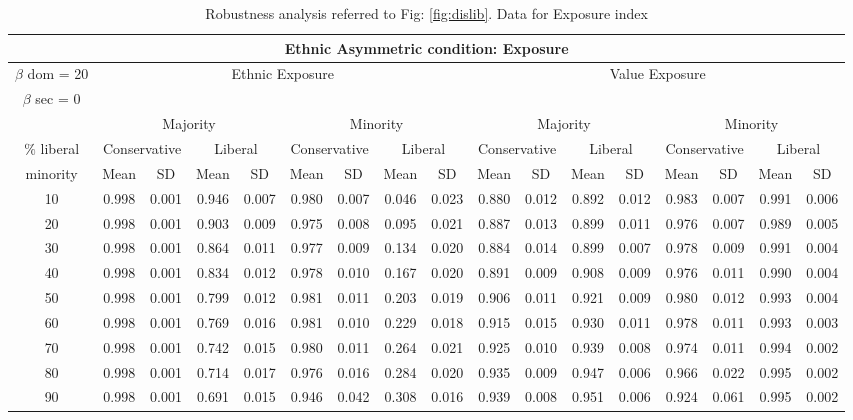 \documentclass{article}
\begin{document}
\begin{table}[H]
{\begin{tabular}{|c|c|c|c|c|c|c|c|c|c|c|c|c|c|c|c|c|}
  \hline
  \multicolumn{17}{|c|}{Ethnic Asymmetric condition: Exposure}  \\\hline
 $\beta$ dom = 20 &  \multicolumn{8}{|c|}{Ethnic Exposure} & \multicolumn{8}{|c|}{Value Exposure}   \\
 
  $\beta$ sec = 0 &  \multicolumn{8}{|c|}{} & \multicolumn{8}{|c|}{}   \\\hline
 
 & \multicolumn{4}{|c|}{Majority} & \multicolumn{4}{|c|}{Minority}  & \multicolumn{4}{|c|}{Majority} & \multicolumn{4}{|c|}{Minority}  \\
 $\%$ liberal & \multicolumn{2}{|c|}{Conservative} & \multicolumn{2}{|c|}{Liberal} 
& \multicolumn{2}{|c|}{Conservative} & \multicolumn{2}{|c|}{Liberal} & \multicolumn{2}{|c|}{Conservative} & \multicolumn{2}{|c|}{Liberal} 
& \multicolumn{2}{|c|}{Conservative} & \multicolumn{2}{|c|}{Liberal}\\
 minority & Mean & SD & Mean & SD & Mean & SD & Mean & SD & Mean & SD & Mean & SD & Mean & SD & Mean & SD\\
 \hline
  10 & 0.998 & 0.001 & 0.946 & 0.007 & 0.980 & 0.007 & 0.046 & 0.023 & 0.880 & 0.012 & 0.892 & 0.012 & 0.983 & 0.007 & 0.991 & 0.006 \\ 
    20 & 0.998 & 0.001 & 0.903 & 0.009 & 0.975 & 0.008 & 0.095 & 0.021 & 0.887 & 0.013 & 0.899 & 0.011 & 0.976 & 0.007 & 0.989 & 0.005 \\ 
    30 & 0.998 & 0.001 & 0.864 & 0.011 & 0.977 & 0.009 & 0.134 & 0.020 & 0.884 & 0.014 & 0.899 & 0.007 & 0.978 & 0.009 & 0.991 & 0.004 \\ 
    40 & 0.998 & 0.001 & 0.834 & 0.012 & 0.978 & 0.010 & 0.167 & 0.020 & 0.891 & 0.009 & 0.908 & 0.009 & 0.976 & 0.011 & 0.990 & 0.004 \\ 
    50 & 0.998 & 0.001 & 0.799 & 0.012 & 0.981 & 0.011 & 0.203 & 0.019 & 0.906 & 0.011 & 0.921 & 0.009 & 0.980 & 0.012 & 0.993 & 0.004 \\ 
    60 & 0.998 & 0.001 & 0.769 & 0.016 & 0.981 & 0.010 & 0.229 & 0.018 & 0.915 & 0.015 & 0.930 & 0.011 & 0.978 & 0.011 & 0.993 & 0.003 \\ 
    70 & 0.998 & 0.001 & 0.742 & 0.015 & 0.980 & 0.011 & 0.264 & 0.021 & 0.925 & 0.010 & 0.939 & 0.008 & 0.974 & 0.011 & 0.994 & 0.002 \\ 
    80 & 0.998 & 0.001 & 0.714 & 0.017 & 0.976 & 0.016 & 0.284 & 0.020 & 0.935 & 0.009 & 0.947 & 0.006 & 0.966 & 0.022 & 0.995 & 0.002 \\ 
    90 & 0.998 & 0.001 & 0.691 & 0.015 & 0.946 & 0.042 & 0.308 & 0.016 & 0.939 & 0.008 & 0.951 & 0.006 & 0.924 & 0.061 & 0.995 & 0.002 \\ 
   \hline
\end{tabular}
}

\caption{Robustness analysis referred to Fig: \ref{fig:dislib}. Data for Exposure index}
\label{tab:dislib_exp}
\end{table}
\end{document}
